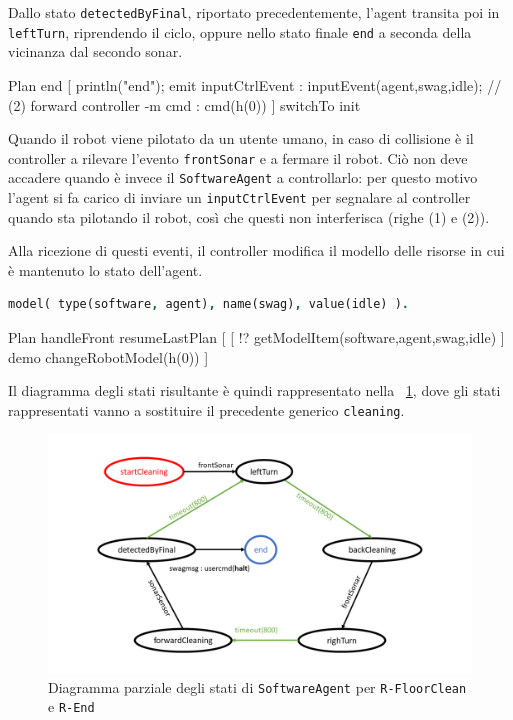 \documentclass{../llncs}
\newcommand{\codescript}[1]{{\mbox{\small{\texttt{#1}}}}\xspace}
\newcommand{\code}[1]{{\color{blue}\small{\texttt{#1}}}}
\newcommand{\labelfig}[1]{\label{fig:#1}}
\newcommand{\xf}[1]{\figurename~\ref{fig:#1}}
\begin{document}
Dallo stato \codescript{detectedByFinal}, riportato precedentemente, l'agent transita poi in \codescript{leftTurn}, riprendendo il ciclo, oppure nello stato finale \codescript{end} a seconda della vicinanza dal secondo sonar.\\

\begin{qacode}[caption={SoftwareAgent, pt6}]
Plan end [
	println("end");
	emit inputCtrlEvent : inputEvent(agent,swag,idle); // (2)
	forward controller -m cmd : cmd(h(0))
]
switchTo init
\end{qacode}

Quando il robot viene pilotato da un utente umano, in caso di collisione è il controller a rilevare l'evento \codescript{frontSonar} e a fermare il robot. Ciò non deve accadere quando è invece il \texttt{SoftwareAgent} a controllarlo: per questo motivo l'agent si fa carico di inviare un \codescript{inputCtrlEvent} per segnalare al controller quando sta pilotando il robot, così che questi non interferisca (righe (1) e (2)).

Alla ricezione di questi eventi, il controller modifica il modello delle risorse in cui è mantenuto lo stato dell'agent.\\

\begin{lstlisting}[language=Prolog, keywordstyle=\color{black}, caption={resourceModel.pl}]
% modello dell'agent
model( type(software, agent), name(swag), value(idle) ).
\end{lstlisting}

\begin{qacode}[caption={Gestione di \codescript{frontSonar} da parte del \texttt{Controller}}]
Plan handleFront resumeLastPlan [
	[ !? getModelItem(software,agent,swag,idle) ]
		demo changeRobotModel(h(0))
]
\end{qacode}

Il diagramma degli stati risultante è quindi rappresentato nella \xf{floorClean}, dove gli stati rappresentati vanno a sostituire il precedente generico \codescript{cleaning}.

\begin{figure}[!htb]
\centering
\includegraphics[scale=0.4]{img/stateDiagramCleaning.png}
\caption{Diagramma parziale degli stati di \texttt{SoftwareAgent} per \code{R-FloorClean} e \code{R-End}}\labelfig{floorClean}
\end{figure}
\end{document}
